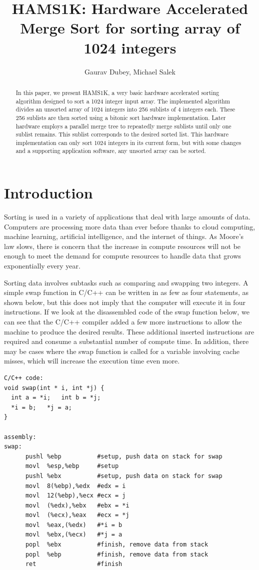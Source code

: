 \documentclass{article}
\title{HAMS1K: Hardware Accelerated Merge Sort for sorting array of 1024 integers}
\author{Gaurav Dubey, Michael Salek}
\begin{document}
\maketitle

\begin{abstract}
In this paper, we present HAMS1K, a very basic hardware accelerated sorting algorithm designed to sort a 1024 integer input array. The implemented algorithm divides an unsorted array of 1024 integers into 256 sublists of 4 integers each. These 256 sublists are then sorted using a bitonic sort hardware implementation. Later hardware employs a parallel merge tree to repeatedly merge sublists until only one sublist remains. This sublist corresponds to the desired sorted list. This hardware implementation can only sort 1024 integers in its current form, but with some changes and a supporting application software, any unsorted array can be sorted. 
\end{abstract}

\section{Introduction}

Sorting is used in a variety of applications that deal with large amounts of data. Computers are processing more data than ever before thanks to cloud computing, machine learning, artificial intelligence, and the internet of things. As Moore's law slows, there is concern that the increase in compute resources will not be enough to meet the demand for compute resources to handle data that grows exponentially every year.

Sorting data involves subtasks such as comparing and swapping two integers. A simple swap function in C/C++ can be written in as few as four statements, as shown below, but this does not imply that the computer will execute it in four instructions. If we look at the disassembled code of the swap function below, we can see that the C/C++ compiler added a few more instructions to allow the machine to produce the desired results. These additional inserted instructions are required and consume a substantial number of compute time. In addition, there may be cases where the swap function is called for a variable involving cache misses, which will increase the execution time even more. 


\begin{lstlisting}
C/C++ code:
void swap(int * i, int *j) {
  int a = *i;   int b = *j;
  *i = b;   *j = a;
}

assembly:
swap:
      pushl %ebp          #setup, push data on stack for swap
      movl  %esp,%ebp     #setup
      pushl %ebx          #setup, push data on stack for swap
      movl  8(%ebp),%edx  #edx = i
      movl  12(%ebp),%ecx #ecx = j
      movl  (%edx),%ebx   #ebx = *i
      movl  (%ecx),%eax   #ecx = *j
      movl  %eax,(%edx)   #*i = b
      movl  %ebx,(%ecx)   #*j = a
      popl  %ebx          #finish, remove data from stack
      popl  %ebp          #finish, remove data from stack
      ret                 #finish
\end{lstlisting}
\end{document}
